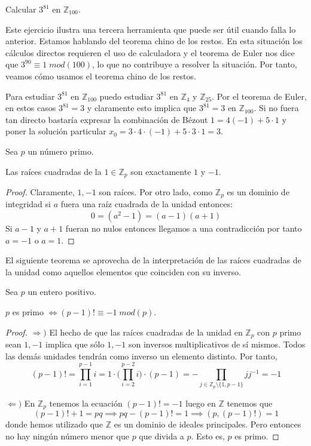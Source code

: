 \begin{example}
	Calcular $3^{81}$ en $\mathbb{Z}_{100}$. 
	
	Este ejercicio ilustra una tercera herramienta que puede ser útil cuando falla lo anterior. Estamos hablando del teorema chino de los restos. En esta situación los cálculos directos requieren el uso de calculadora y el teorema de Euler nos dice que $3^{90} \equiv 1 \; mod(100)$, lo que no contribuye a resolver la situación. Por tanto, veamos cómo usamos el teorema chino de los restos. 
	
	Para estudiar $3^{81}$ en $\mathbb{Z}_{100}$ puedo estudiar $3^{81}$ en $\mathbb{Z}_4$ y $\mathbb{Z}_{25}$. Por el teorema de Euler, en estos casos $3^{81} = 3$ y claramente esto implica que $3^{81} = 3$ en $\mathbb{Z}_{100}$. Si no fuera tan directo bastaría expresar la combinación de Bézout $1 = 4(-1) + 5\cdot 1$ y poner la solución particular $x_0 = 3 \cdot 4 \cdot (-1) + 5 \cdot 3 \cdot 1 = 3$. 
\end{example}

\begin{lemma}
Sea $p$ un número primo. 

Las raíces cuadradas de la $1 \in \mathbb{Z}_p$ son exactamente $1$ y $-1$. 
\end{lemma}
\begin{proof}
Claramente, $1,-1$ son raíces. Por otro lado, como $\mathbb{Z}_p$ es un dominio de integridad si $a$ fuera una raíz cuadrada de la unidad entonces: $$0 = (a^2-1) = (a-1)(a+1)$$ Si $a-1$ y $a+1$ fueran no nulos entonces llegamos a una contradicción por tanto $a = -1$ o $a = 1$. 
\end{proof}

El siguiente teorema se aprovecha de la interpretación de las raíces cuadradas de la unidad como aquellos elementos que coinciden con su inverso. 

\begin{theorem}
Sea $p$ un entero positivo. 

$p$ es primo $\iff (p-1)! \equiv -1 \; mod(p)$.
\end{theorem}
\begin{proof}
$\Rightarrow)$ El hecho de que las raíces cuadradas de la unidad en $\mathbb{Z}_p$ con $p$ primo sean $1,-1$ implica que sólo $1,-1$ son inversos multiplicativos de sí mismos. Todos las demás unidades tendrán como inverso un elemento distinto. Por tanto, $$(p-1)! = \prod_{i = 1}^{p-1} i = 1 \cdot \Big(\prod_{i = 2}^{p-2} i\Big) \cdot (p-1) = -\prod_{j \in \mathbb{Z}_p \setminus \{1,p-1\}} jj^{-1} = -1$$

$\Leftarrow)$ En $\mathbb{Z}_p$ tenemos la ecuación $(p-1)! = -1$ luego en $\mathbb{Z}$ tenemos que $$(p-1)! + 1 = pq \implies pq - (p-1)! = 1 \implies (p,(p-1)!) = 1$$ donde hemos utilizado que $\mathbb{Z}$ es un dominio de ideales principales. Pero entonces no hay ningún número menor que $p$ que divida a $p$. Esto es, $p$ es primo. 
\end{proof}






